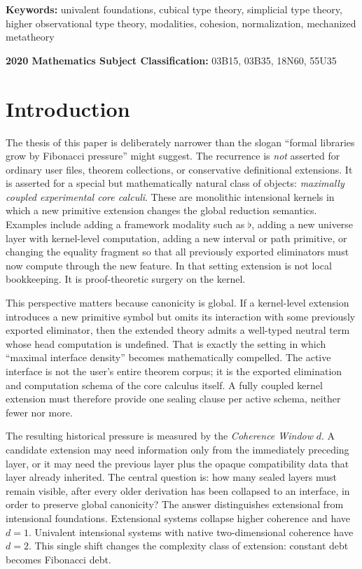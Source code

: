 \documentclass{lmcs}
\theoremstyle{plain}
\theoremstyle{definition}
\theoremstyle{remark}
\newcommand{\keywords}[1]{\par\medskip\noindent\textbf{Keywords: }#1}
\newcommand{\subjclass}[1]{\par\medskip\noindent\textbf{2020 Mathematics Subject Classification: }#1}
\begin{document}
\keywords{univalent foundations, cubical type theory, simplicial type theory, higher observational type theory, modalities, cohesion, normalization, mechanized metatheory}
\subjclass{03B15, 03B35, 18N60, 55U35}

\section{Introduction}

The thesis of this paper is deliberately narrower than the slogan ``formal libraries grow by Fibonacci pressure'' might suggest.
The recurrence is \emph{not} asserted for ordinary user files, theorem collections, or conservative definitional extensions.
It is asserted for a special but mathematically natural class of objects: \emph{maximally coupled experimental core calculi}.
These are monolithic intensional kernels in which a new primitive extension changes the global reduction semantics.
Examples include adding a framework modality such as $\flat$, adding a new universe layer with kernel-level computation, adding a new interval or path primitive, or changing the equality fragment so that all previously exported eliminators must now compute through the new feature.
In that setting extension is not local bookkeeping.
It is proof-theoretic surgery on the kernel.

This perspective matters because canonicity is global.
If a kernel-level extension introduces a new primitive symbol but omits its interaction with some previously exported eliminator, then the extended theory admits a well-typed neutral term whose head computation is undefined.
That is exactly the setting in which ``maximal interface density'' becomes mathematically compelled.
The active interface is not the user's entire theorem corpus; it is the exported elimination and computation schema of the core calculus itself.
A fully coupled kernel extension must therefore provide one sealing clause per active schema, neither fewer nor more.

The resulting historical pressure is measured by the \emph{Coherence Window} $d$.
A candidate extension may need information only from the immediately preceding layer, or it may need the previous layer plus the opaque compatibility data that layer already inherited.
The central question is: how many sealed layers must remain visible, after every older derivation has been collapsed to an interface, in order to preserve global canonicity?
The answer distinguishes extensional from intensional foundations.
Extensional systems collapse higher coherence and have $d=1$.
Univalent intensional systems with native two-dimensional coherence have $d=2$.
This single shift changes the complexity class of extension: constant debt becomes Fibonacci debt.
\end{document}
